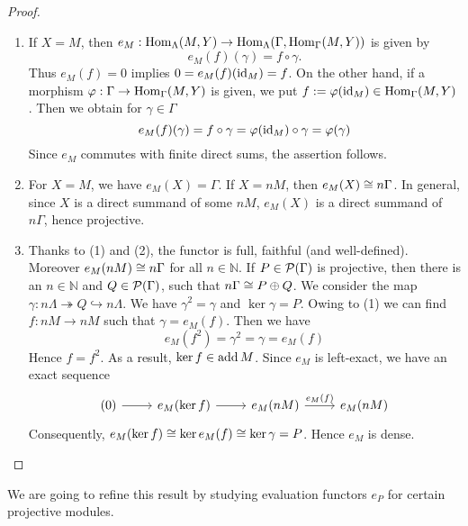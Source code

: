 
\begin{proof}\
  \begin{enumerate}
  \item If $X = M$, then $e_M: \operatorname{Hom}_\Lambda(M,Y) \to \operatorname{Hom}_\Lambda(\Gamma,\operatorname{Hom}_\Gamma(M,Y))$ is given by
\[
e_M(f)(\gamma) = f \circ \gamma.
\]
Thus $e_M(f) = 0$ implies $0 = e_M(f)(\operatorname{id}_M) = f$. On
    the other hand, if a morphism $\varphi: \Gamma \to \operatorname{Hom}_\Gamma(M,Y)$ is given, we put $f := \varphi(\operatorname{id}_M)
    \in \operatorname{Hom}_\Gamma(M,Y)$. Then we obtain for $\gamma \in \Gamma$
      \[ e_M(f)(\gamma) = f \circ \gamma = \varphi(\operatorname{id}_M)\circ \gamma = \varphi(\gamma) \]
    Since $e_M$ commutes with finite direct sums, the assertion follows.
  \item For $X = M$, we have $e_M(X) = \Gamma$. If $X = nM$, then $e_M(X) \cong
    n\Gamma$. In general, since $X$ is a direct summand of some $nM$, $e_M(X)$ is a
    direct summand of $n\Gamma$, hence projective.
  \item Thanks to (1) and (2), the functor is full, faithful (and well-defined).
    Moreover $e_M(nM) \cong n\Gamma$ for all $n \in \mathbb{N}$.
     If $P \in \mathcal{P}(\Gamma)$ is projective, then there is an $n \in \mathbb{N}$ and $Q
    \in \mathcal{P}(\Gamma)$, such that $n\Gamma \cong P \oplus Q$. We consider the map $\gamma:n\Lambda\twoheadrightarrow Q \hookrightarrow n\Lambda$. We have $\gamma^2 = \gamma$ and $\ker \gamma = P$.
    Owing to (1) we can find $f: nM \to nM$ such that $\gamma = e_M(f)$. Then we have
      \[ e_M(f^2) = \gamma^2 = \gamma = e_M(f) \]
    Hence $f = f^2$. As a result, $\ker f \in \operatorname{add}{M}$. Since $e_M$ is left-exact,
    we have an exact sequence
      \[ \begin{tikzcd}
          (0) \rar& e_M(\ker f) \rar& e_M(nM) \rar["e_M(f)"] & e_M(nM)
        \end{tikzcd} \]
    Consequently, $e_M(\ker f) \cong \ker e_M(f) \cong \ker \gamma = P$. Hence $e_M$ is
    dense. \qedhere
  \end{enumerate}
\end{proof}


We are going to refine this result by studying evaluation functors $e_P$ for
certain projective modules.


